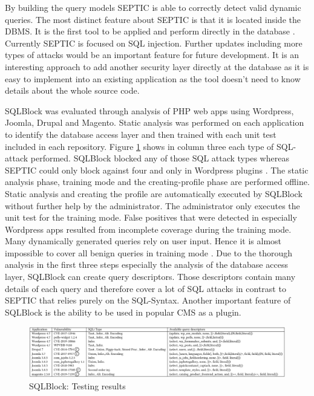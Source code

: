 By building the query models SEPTIC is able to correctly detect valid dynamic queries. The most distinct feature about SEPTIC is that it is located inside the DBMS. It is the first tool to be applied and perform directly in the database \autocite[1182f, 1186]{Medeiros2019}. Currently SEPTIC is focused on SQL injection. Further updates including more types of attacks would be an important feature for future development. It is an interesting approach to add another security layer directly at the database as it is easy to implement into an existing application as the tool doesn't need to know details about the whole source code.\newline


SQLBlock was evaluated through analysis of PHP web apps using Wordpress, Joomla, Drupal and Magento. Static analysis was performed on each application to identify the database access layer and then trained with each unit test included in each repository. Figure \ref{sqlblock} shows in column three each type of SQL-attack performed. SQLBlock blocked any of those SQL attack types whereas SEPTIC could only block against four and only in Wordpress plugins \autocite[11]{Jahanshahi2018}. The static analysis phase, training mode and the creating-profile phase are performed offline. Static analysis and creating the profile are automatically executed by SQLBlock without further help by the administrator. The administrator only executes the unit test for the training mode. False positives that were detected in especially Wordpress apps resulted from incomplete coverage during the training mode. Many dynamically generated queries rely on user input. Hence it is almost impossible to cover all benign queries in training mode \autocite[10-12]{Jahanshahi2018}. Due to the thorough analysis in the first three steps especially the analysis of the database access layer, SQLBlock can create query descriptors. Those descriptors contain many details of each query and therefore cover a lot of SQL attacks in contrast to SEPTIC that relies purely on the SQL-Syntax. Another important feature of SQLBlock is the ability to be used in popular CMS as a plugin.

\begin{figure}
\centering
\includegraphics[scale=0.75]{sqlblock.PNG}
\caption{SQLBlock: Testing results \autocite[12]{Jahanshahi2018}}
\label{sqlblock}
\end{figure}

